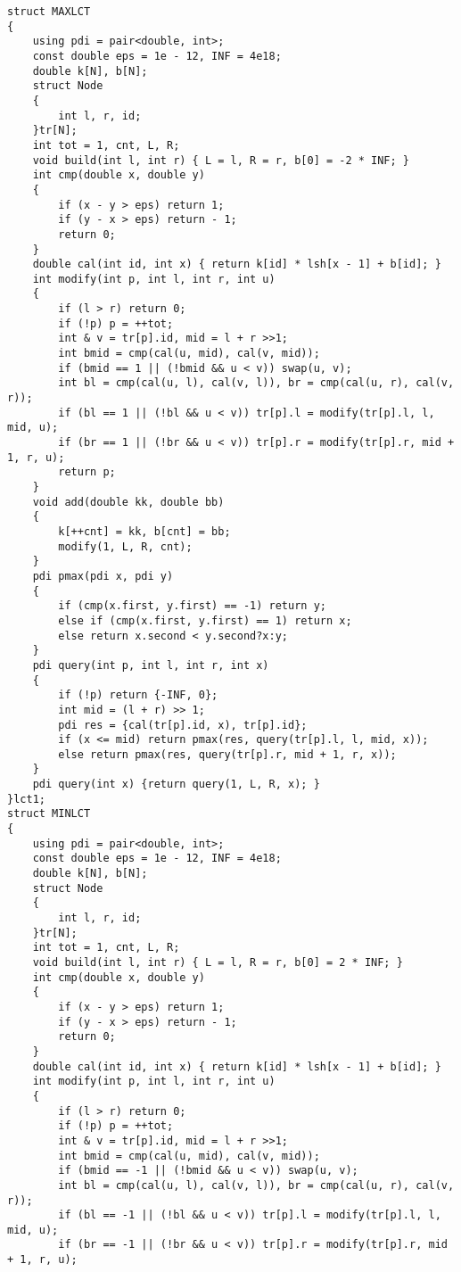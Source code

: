 \documentclass[a4paper, fontset=none]{ctexart}
\begin{document}
\begin{verbatim}
struct MAXLCT
{
    using pdi = pair<double, int>;
    const double eps = 1e - 12, INF = 4e18;
    double k[N], b[N];
    struct Node
    {
        int l, r, id;
    }tr[N];
    int tot = 1, cnt, L, R;
    void build(int l, int r) { L = l, R = r, b[0] = -2 * INF; }
    int cmp(double x, double y)
    {
        if (x - y > eps) return 1;
        if (y - x > eps) return - 1;
        return 0;
    }
    double cal(int id, int x) { return k[id] * lsh[x - 1] + b[id]; }
    int modify(int p, int l, int r, int u)
    {
        if (l > r) return 0;
        if (!p) p = ++tot;
        int & v = tr[p].id, mid = l + r >>1;
        int bmid = cmp(cal(u, mid), cal(v, mid));
        if (bmid == 1 || (!bmid && u < v)) swap(u, v);
        int bl = cmp(cal(u, l), cal(v, l)), br = cmp(cal(u, r), cal(v, r));
        if (bl == 1 || (!bl && u < v)) tr[p].l = modify(tr[p].l, l, mid, u);
        if (br == 1 || (!br && u < v)) tr[p].r = modify(tr[p].r, mid + 1, r, u);
        return p;
    }
    void add(double kk, double bb)
    {
        k[++cnt] = kk, b[cnt] = bb;
        modify(1, L, R, cnt);
    }
    pdi pmax(pdi x, pdi y)
    {
        if (cmp(x.first, y.first) == -1) return y;
        else if (cmp(x.first, y.first) == 1) return x;
        else return x.second < y.second?x:y;
    }
    pdi query(int p, int l, int r, int x)
    {
        if (!p) return {-INF, 0};
        int mid = (l + r) >> 1;
        pdi res = {cal(tr[p].id, x), tr[p].id};
        if (x <= mid) return pmax(res, query(tr[p].l, l, mid, x));
        else return pmax(res, query(tr[p].r, mid + 1, r, x));
    }
    pdi query(int x) {return query(1, L, R, x); }
}lct1;
struct MINLCT
{
    using pdi = pair<double, int>;
    const double eps = 1e - 12, INF = 4e18;
    double k[N], b[N];
    struct Node
    {
        int l, r, id;
    }tr[N];
    int tot = 1, cnt, L, R;
    void build(int l, int r) { L = l, R = r, b[0] = 2 * INF; }
    int cmp(double x, double y)
    {
        if (x - y > eps) return 1;
        if (y - x > eps) return - 1;
        return 0;
    }
    double cal(int id, int x) { return k[id] * lsh[x - 1] + b[id]; }
    int modify(int p, int l, int r, int u)
    {
        if (l > r) return 0;
        if (!p) p = ++tot;
        int & v = tr[p].id, mid = l + r >>1;
        int bmid = cmp(cal(u, mid), cal(v, mid));
        if (bmid == -1 || (!bmid && u < v)) swap(u, v);
        int bl = cmp(cal(u, l), cal(v, l)), br = cmp(cal(u, r), cal(v, r));
        if (bl == -1 || (!bl && u < v)) tr[p].l = modify(tr[p].l, l, mid, u);
        if (br == -1 || (!br && u < v)) tr[p].r = modify(tr[p].r, mid + 1, r, u);

\end{verbatim}
\end{document}
